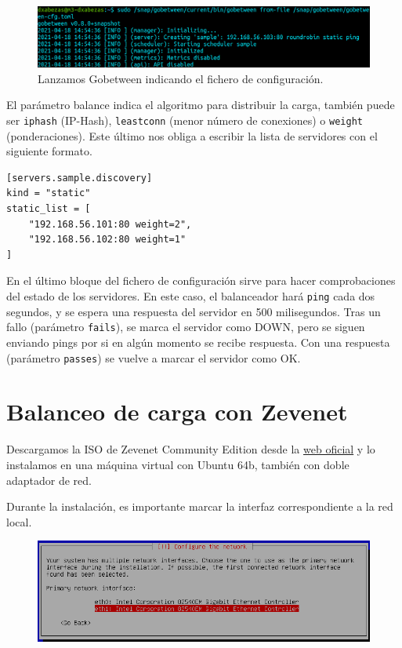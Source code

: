 \documentclass{article}
\begin{document}
\begin{figure}[H]
	\centering
	\includegraphics[width=160mm]{imgs/gobetween}
	\caption{Lanzamos Gobetween indicando el fichero de configuración.}
	\label{fig:gobetween}
\end{figure}

El parámetro balance indica el algoritmo para distribuir la carga, también puede ser \texttt{iphash} (IP-Hash),
\texttt{leastconn} (menor número de conexiones) o \texttt{weight} (ponderaciones). Este último nos obliga a escribir la
lista de servidores con el siguiente formato.
\begin{Verbatim}[tabsize=4]
[servers.sample.discovery]
kind = "static"
static_list = [
	"192.168.56.101:80 weight=2",
	"192.168.56.102:80 weight=1"
]
\end{Verbatim}

En el último bloque del fichero de configuración sirve para hacer comprobaciones del estado de los servidores.
En este caso, el balanceador hará \texttt{ping} cada dos segundos, y se espera una respuesta del servidor en 500
milisegundos. Tras un fallo (parámetro \texttt{fails}), se marca el servidor como DOWN, pero se siguen enviando pings
por si en algún momento se recibe respuesta. Con una respuesta (parámetro \texttt{passes}) se vuelve a marcar el
servidor como OK.

\section{Balanceo de carga con Zevenet}

Descargamos la ISO de Zevenet Community Edition desde la \href{https://www.zevenet.com/products/community/}{web oficial} y lo instalamos en una máquina virtual
con Ubuntu 64b, también con doble adaptador de red.

Durante la instalación, es importante marcar la interfaz correspondiente a la red local.

\begin{figure}[H]
	\centering
	\includegraphics[width=120mm]{imgs/zev-install-adapter}
\end{figure}
\end{document}
